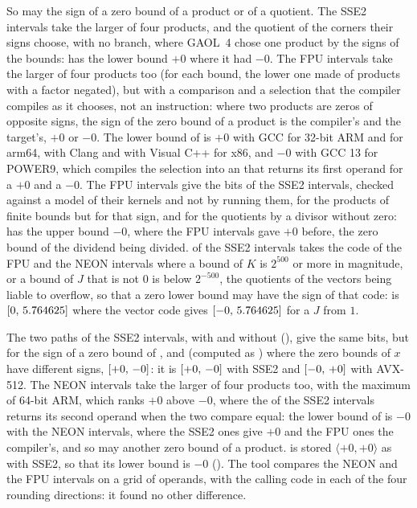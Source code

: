 \documentclass[12pt,a4paper,twoside,openright]{book}
\begin{document}
So may the sign of a zero bound of a product or of a quotient. The SSE2
intervals take the larger of four products, and the quotient of the
corners their signs choose, with no branch, where GAOL~4 chose one product
by the signs of the bounds: \code{[-1, 0] * [-1, 0]} has the lower bound
$+0$ where it had $-0$.\newinvfive{} The FPU intervals take the larger of
four products too (for each bound, the lower one made of products with a
factor negated),\newinvfive{} but with a comparison and a selection that
the compiler compiles as it chooses, not an instruction: where two
products are zeros of opposite signs, the sign of the zero bound of a
product is the compiler's and the target's, $+0$ or $-0$. The lower bound
of \code{[-1, 0] * [-1, 0]} is $+0$ with GCC for 32-bit ARM and for arm64,
with Clang and with Visual C++ for x86, and $-0$ with GCC 13 for POWER9,
which compiles the selection into an  that returns its
first operand for a $+0$ and a $-0$. The FPU intervals give the bits of
the SSE2 intervals, checked against a model of their kernels and not by
running them, for the products of finite bounds but for that sign, and for
the quotients by a divisor without zero: \code{[0, 1] / [-2, -1]} has the
upper bound $-0$, where the FPU intervals gave $+0$ before, the zero bound
of the dividend being divided.  of the SSE2
intervals takes the code of the FPU and the NEON intervals where a bound of
$K$ is $2^{500}$ or more in magnitude, or a bound of $J$ that is not $0$
is below $2^{-500}$, the quotients of the vectors being liable to
overflow,\newinvfive{} so that a zero lower bound may have the sign of
that code: 
is $[0,\,5.764625]$ where the vector code gives $[-0,\,5.764625]$
for a $J$ from $1$.

\medskip
The two paths of the SSE2 intervals, with and without
 (), give the same bits, but
for the sign of a zero bound of ,  and
 (computed as ) where the zero bounds of $x$ have
different signs, $[+0,\,-0]$: it is $[+0,\,-0]$ with SSE2 and
$[-0,\,+0]$ with AVX-512. The NEON intervals take the larger of four
products too,\newinvfive{} with the maximum of 64-bit ARM, which ranks
$+0$ above $-0$, where the  of the SSE2 intervals returns its
second operand when the two compare equal: the lower bound of
\code{[-1, 0] * [-1, 0]} is $-0$ with the NEON intervals, where the SSE2
ones give $+0$ and the FPU ones the compiler's, and so may another zero
bound of a product.  is stored
$\langle+0, +0\rangle$ as with SSE2, so that its lower bound is $-0$
(). The tool  compares the NEON
and the FPU intervals on a grid of operands, with the calling code in each
of the four rounding directions: it found no other difference.
\end{document}
